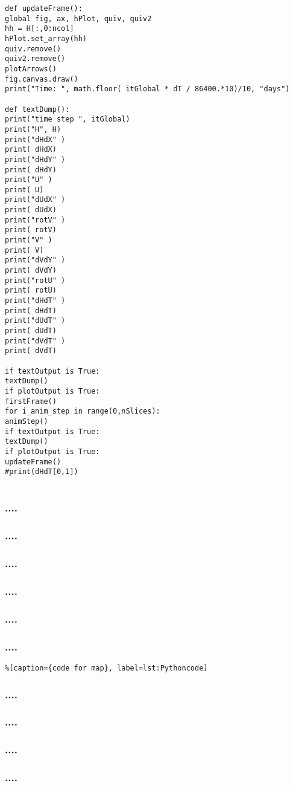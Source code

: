 \begin{lstlisting}
def updateFrame():
global fig, ax, hPlot, quiv, quiv2
hh = H[:,0:ncol]
hPlot.set_array(hh)
quiv.remove()    
quiv2.remove()
plotArrows()
fig.canvas.draw()
print("Time: ", math.floor( itGlobal * dT / 86400.*10)/10, "days")

def textDump():
print("time step ", itGlobal)    
print("H", H)
print("dHdX" )
print( dHdX)
print("dHdY" )
print( dHdY)
print("U" )
print( U)
print("dUdX" )
print( dUdX)
print("rotV" )
print( rotV)
print("V" )
print( V)
print("dVdY" )
print( dVdY)
print("rotU" )
print( rotU)
print("dHdT" )
print( dHdT)
print("dUdT" )
print( dUdT)
print("dVdT" )
print( dVdT)

if textOutput is True:
textDump()
if plotOutput is True:
firstFrame()
for i_anim_step in range(0,nSlices):
animStep()
if textOutput is True:
textDump()
if plotOutput is True:
updateFrame()
#print(dHdT[0,1])


\end{lstlisting}

\subsubsection{....}\index{}
\subsubsection{....}\index{}
\subsubsection{....}\index{}
\subsubsection{....}\index{}
\subsubsection{....}\index{}


\subsubsection{....}\index{}


\begin{lstlisting}%[caption={code for map}, label=lst:Pythoncode]

\end{lstlisting}

\subsubsection{....}\index{}
\subsubsection{....}\index{}
\subsubsection{....}\index{}
\subsubsection{....}\index{}